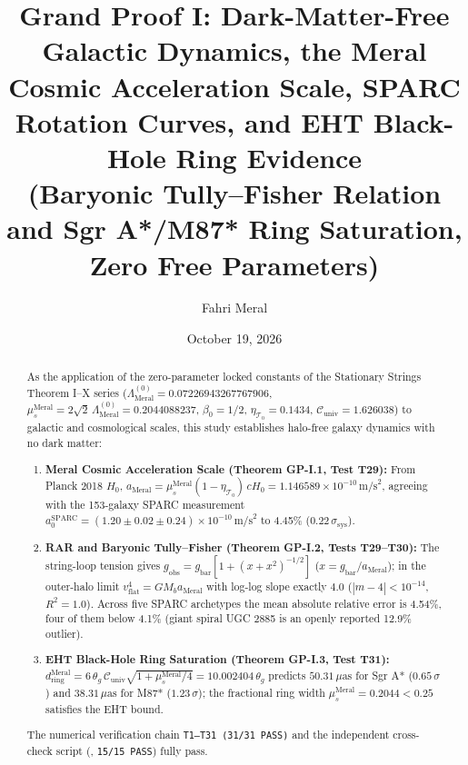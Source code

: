 \documentclass[12pt,a4paper]{article}
\title{\textbf{Grand Proof I: Dark-Matter-Free Galactic Dynamics, the Meral Cosmic Acceleration Scale, SPARC Rotation Curves, and EHT Black-Hole Ring Evidence} \\[0.3cm]
\large (Baryonic Tully--Fisher Relation and Sgr A*/M87* Ring Saturation, Zero Free Parameters)}
\author{Fahri Meral}
\date{October 19, 2026}
\begin{document}
\maketitle

\begin{abstract}
As the application of the zero-parameter locked constants of the Stationary
Strings Theorem I--X series
($\Lambda_{\mathrm{Meral}}^{(0)} = 0.07226943267767906$,
$\mu_s^{\mathrm{Meral}} = 2\sqrt{2}\,\Lambda_{\mathrm{Meral}}^{(0)} = 0.2044088237$,
$\beta_0 = 1/2$, $\eta_{\mathcal{T}_0} = 0.1434$,
$\mathcal{C}_{\mathrm{univ}} = 1.626038$) to galactic and cosmological scales,
this study establishes halo-free galaxy dynamics with no dark matter:
\begin{enumerate}
    \item \textbf{Meral Cosmic Acceleration Scale (Theorem GP-I.1, Test T29):}
    From Planck 2018 $H_0$,
    $a_{\mathrm{Meral}} = \mu_s^{\mathrm{Meral}}(1-\eta_{\mathcal{T}_0})\,cH_0
    = 1.146589\times 10^{-10}\,\mathrm{m/s}^2$, agreeing with the
    153-galaxy SPARC measurement
    $a_0^{\mathrm{SPARC}} = (1.20\pm 0.02\pm 0.24)\times
    10^{-10}\,\mathrm{m/s}^2$ to 4.45\% ($0.22\,\sigma_{\mathrm{sys}}$).
    \item \textbf{RAR and Baryonic Tully--Fisher (Theorem GP-I.2, Tests T29--T30):}
    The string-loop tension gives
    $g_{\mathrm{obs}} = g_{\mathrm{bar}}[1+(x+x^2)^{-1/2}]$
    ($x = g_{\mathrm{bar}}/a_{\mathrm{Meral}}$); in the outer-halo limit
    $v_{\mathrm{flat}}^4 = GM_b a_{\mathrm{Meral}}$ with log-log slope exactly
    $4.0$ ($|m-4|<10^{-14}$, $R^2 = 1.0$). Across five SPARC archetypes the mean
    absolute relative error is 4.54\%, four of them below 4.1\%
    (giant spiral UGC 2885 is an openly reported 12.9\% outlier).
    \item \textbf{EHT Black-Hole Ring Saturation (Theorem GP-I.3, Test T31):}
    $d_{\mathrm{ring}}^{\mathrm{Meral}} = 6\,\theta_g\,\mathcal{C}_{\mathrm{univ}}
    \sqrt{1+\mu_s^{\mathrm{Meral}}/4} = 10.002404\,\theta_g$ predicts
    $50.31\,\mu\mathrm{as}$ for Sgr A* ($0.65\,\sigma$) and
    $38.31\,\mu\mathrm{as}$ for M87* ($1.23\,\sigma$); the fractional ring width
    $\mu_s^{\mathrm{Meral}} = 0.2044 < 0.25$ satisfies the EHT bound.
\end{enumerate}
The numerical verification chain \texttt{T1--T31 (31/31 PASS)} and the
independent cross-check script (, \texttt{15/15 PASS})
fully pass.
\end{abstract}
\end{document}

